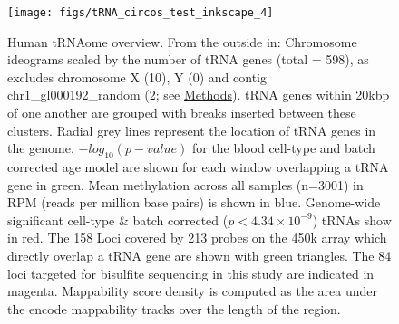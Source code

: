 \documentclass[]{book}
\begin{document}
\begin{table}[t]

\caption{\label{tab:GWSBBtRNAsTab}Significantly Hypermethylating tRNAs in blood cell-type and batch corrected model MeDIP-seq. `Slope' corresponds to the beta value for methylation in the linear model.}
\centering
{}
\end{table}



\begin{figure}

{\centering \texttt{[image: figs/tRNA\_circos\_test\_inkscape\_4]} 

}

\caption{Human tRNAome overview. From the outside in: Chromosome ideograms scaled by the number of tRNA genes (total = 598), as excludes chromosome X (10), Y (0) and contig chr1\_gl000192\_random (2; see \protect\hyperlink{tRNAanno}{Methods}). tRNA genes within 20kbp of one another are grouped with breaks inserted between these clusters. Radial grey lines represent the location of tRNA genes in the genome. \(-log_{10}(p-value)\) for the blood cell-type and batch corrected age model are shown for each window overlapping a tRNA gene in green. Mean methylation across all samples (n=3001) in RPM (reads per million base pairs) is shown in blue. Genome-wide significant cell-type \& batch corrected (\(p < 4.34\times10^{-9}\)) tRNAs show in red. The 158 Loci covered by 213 probes on the 450k array which directly overlap a tRNA gene are shown with green triangles. The 84 loci targeted for bisulfite sequencing in this study are indicated in magenta. Mappability score density is computed as the area under the encode mappability tracks \citep{Derrien2012} over the length of the region.}\label{fig:circos}
\end{figure}



\newpage
\end{document}
